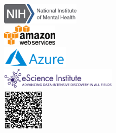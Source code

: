 \documentclass[a0paper,landscape,fontscale=0.365]{baposter}
\begin{document}
\begin{poster}
{\smaller %
\includegraphics[align=c, height=1.0cm]{logos/nimh-logo.png}\\
\includegraphics[align=c, height=1.0cm]{logos/awslogo}\\
\includegraphics[align=c, height=1.0cm]{logos/azure}\\
\includegraphics[align=c, height=1.0cm]{logos/eSciencelogo.png}\\
\includegraphics[align=c, height=2.0cm]{qr}%

}

\end{poster}
\end{document}
